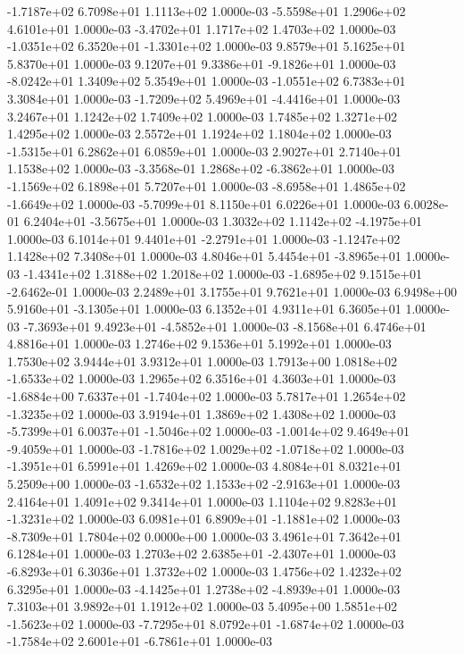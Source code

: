 -1.7187e+02  6.7098e+01  1.1113e+02  1.0000e-03
-5.5598e+01  1.2906e+02  4.6101e+01  1.0000e-03
-3.4702e+01  1.1717e+02  1.4703e+02  1.0000e-03
-1.0351e+02  6.3520e+01 -1.3301e+02  1.0000e-03
9.8579e+01 5.1625e+01 5.8370e+01  1.0000e-03
 9.1207e+01  9.3386e+01 -9.1826e+01  1.0000e-03
-8.0242e+01  1.3409e+02  5.3549e+01  1.0000e-03
-1.0551e+02  6.7383e+01  3.3084e+01  1.0000e-03
-1.7209e+02  5.4969e+01 -4.4416e+01  1.0000e-03
3.2467e+01 1.1242e+02 1.7409e+02  1.0000e-03
1.7485e+02 1.3271e+02 1.4295e+02  1.0000e-03
2.5572e+01 1.1924e+02 1.1804e+02  1.0000e-03
-1.5315e+01  6.2862e+01  6.0859e+01  1.0000e-03
2.9027e+01 2.7140e+01 1.1538e+02  1.0000e-03
-3.3568e-01  1.2868e+02 -6.3862e+01  1.0000e-03
-1.1569e+02  6.1898e+01  5.7207e+01  1.0000e-03
-8.6958e+01  1.4865e+02 -1.6649e+02  1.0000e-03
-5.7099e+01  8.1150e+01  6.0226e+01  1.0000e-03
 6.0028e-01  6.2404e+01 -3.5675e+01  1.0000e-03
 1.3032e+02  1.1142e+02 -4.1975e+01  1.0000e-03
 6.1014e+01  9.4401e+01 -2.2791e+01  1.0000e-03
-1.1247e+02  1.1428e+02  7.3408e+01  1.0000e-03
 4.8046e+01  5.4454e+01 -3.8965e+01  1.0000e-03
-1.4341e+02  1.3188e+02  1.2018e+02  1.0000e-03
-1.6895e+02  9.1515e+01 -2.6462e-01  1.0000e-03
2.2489e+01 3.1755e+01 9.7621e+01  1.0000e-03
 6.9498e+00  5.9160e+01 -3.1305e+01  1.0000e-03
6.1352e+01 4.9311e+01 6.3605e+01  1.0000e-03
-7.3693e+01  9.4923e+01 -4.5852e+01  1.0000e-03
-8.1568e+01  6.4746e+01  4.8816e+01  1.0000e-03
1.2746e+02 9.1536e+01 5.1992e+01  1.0000e-03
1.7530e+02 3.9444e+01 3.9312e+01  1.0000e-03
 1.7913e+00  1.0818e+02 -1.6533e+02  1.0000e-03
1.2965e+02 6.3516e+01 4.3603e+01  1.0000e-03
-1.6884e+00  7.6337e+01 -1.7404e+02  1.0000e-03
 5.7817e+01  1.2654e+02 -1.3235e+02  1.0000e-03
3.9194e+01 1.3869e+02 1.4308e+02  1.0000e-03
-5.7399e+01  6.0037e+01 -1.5046e+02  1.0000e-03
-1.0014e+02  9.4649e+01 -9.4059e+01  1.0000e-03
-1.7816e+02  1.0029e+02 -1.0718e+02  1.0000e-03
-1.3951e+01  6.5991e+01  1.4269e+02  1.0000e-03
4.8084e+01 8.0321e+01 5.2509e+00  1.0000e-03
-1.6532e+02  1.1533e+02 -2.9163e+01  1.0000e-03
2.4164e+01 1.4091e+02 9.3414e+01  1.0000e-03
 1.1104e+02  9.8283e+01 -1.3231e+02  1.0000e-03
 6.0981e+01  6.8909e+01 -1.1881e+02  1.0000e-03
-8.7309e+01  1.7804e+02  0.0000e+00  1.0000e-03
3.4961e+01 7.3642e+01 6.1284e+01  1.0000e-03
 1.2703e+02  2.6385e+01 -2.4307e+01  1.0000e-03
-6.8293e+01  6.3036e+01  1.3732e+02  1.0000e-03
1.4756e+02 1.4232e+02 6.3295e+01  1.0000e-03
-4.1425e+01  1.2738e+02 -4.8939e+01  1.0000e-03
7.3103e+01 3.9892e+01 1.1912e+02  1.0000e-03
 5.4095e+00  1.5851e+02 -1.5623e+02  1.0000e-03
-7.7295e+01  8.0792e+01 -1.6874e+02  1.0000e-03
-1.7584e+02  2.6001e+01 -6.7861e+01  1.0000e-03
